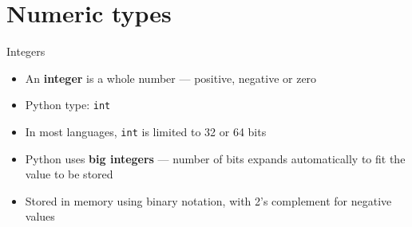\part{Numeric types}
\frame{\partpage}

\begin{frame}{Integers}
	\begin{itemize}
		\pause\item An \textbf{integer} is a whole number --- positive, negative or zero
		\pause\item Python type: \lstinline{int}
		\pause\item In most languages, \lstinline{int} is limited to 32 or 64 bits
		\pause\item Python uses \textbf{big integers} --- number of bits expands automatically to fit the value to be stored
		\pause\item Stored in memory using binary notation, with 2's complement for negative values
	\end{itemize}
\end{frame}


